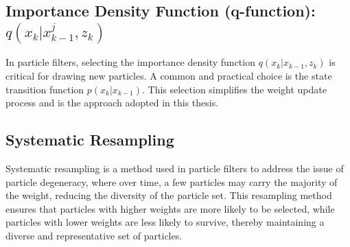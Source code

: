 \subsection{Importance Density Function (q-function): \textbf{$q(x_k | x_{k-1}^{j}, z_k)$}}\label{q function}

In particle filters, selecting the importance density function \( q(x_k | x_{k-1}, z_k) \) is critical for drawing new particles. A common and practical choice is the state transition function \( p(x_k | x_{k-1}) \). This selection simplifies the weight update process and is the approach adopted in this thesis.

\subsection{Systematic Resampling}\label{Systematic Resampling}

Systematic resampling is a method used in particle filters to address the issue of particle degeneracy, where over time, a few particles may carry the majority of the weight, reducing the diversity of the particle set. This resampling method ensures that particles with higher weights are more likely to be selected, while particles with lower weights are less likely to survive, thereby maintaining a diverse and representative set of particles.

